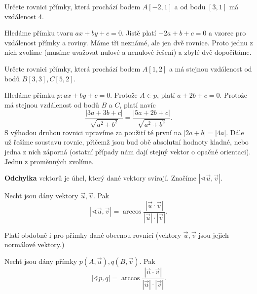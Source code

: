 \begin{priklad}
Určete rovnici přímky, která prochází bodem $A[-2,1]$ a od bodu $[3,1]$ má vzdálenost 4.
\end{priklad}

\begin{reseni}
Hledáme přímku tvaru $ax+by+c=0$. Jistě platí $-2a+b+c=0$ a vzorec pro vzdálenost přímky a roviny.
Máme tři neznámé, ale jen dvě rovnice. Proto jednu z nich zvolíme (musíme uvažovat
nulové a nenulové řešení) a zbylé dvě dopočítáme.
\end{reseni}

\begin{priklad}
Určete rovnici přímky, která prochází bodem $A[1,2]$ a má stejnou vzdálenost od bodů
$B[3,3], C[5,2].$
\end{priklad}

\begin{reseni}
    Hledáme přímku $p: ax+by+c=0$. Protože $A\in p$, platí $a+2b+c=0$. Protože má stejnou vzdálenost od bodů $B$ a $C$, platí navíc
    $$\frac{|3a+3b+c|}{\sqrt{a^2+b^2} }=\frac{|5a+2b+c|}{\sqrt{a^2+b^2} }.$$
    S výhodou druhou rovnici upravíme za použití té první na
    $|2a+b|=|4a|$. Dále už řešíme soustavu rovnic, přičemž jsou buď obě absolutní hodnoty kladné, nebo jedna z nich záporná (ostatní případy
    nám dají stejný vektor o opačné orientaci). Jednu z proměnných zvolíme.
\end{reseni}

\begin{definition}
    \textbf{Odchylka} vektorů je úhel, který dané vektory svírají. Značíme $|\sphericalangle \vec u, \vec v|.$
\end{definition}

\begin{veta}
    Nechť jsou dány vektory $\vec u, \vec v.$ Pak
    $$|\sphericalangle \vec u, \vec v|=\arccos \frac{|\vec u \cdot \vec v|}{|\vec u|\cdot |\vec v|}.$$
\end{veta}

\begin{pozn}
    Platí obdobně i pro přímky dané obecnou rovnicí (vektory $\vec u, \vec v$ jsou
    jejich normálové vektory.)
\end{pozn}

\begin{veta}
    Nechť jsou dány přímky $p(A,\vec u), q(B, \vec v).$ Pak
    $$|\sphericalangle p, q|=\arccos \frac{|\vec u \cdot \vec v|}{|\vec u|\cdot |\vec v|}.$$
\end{veta}


